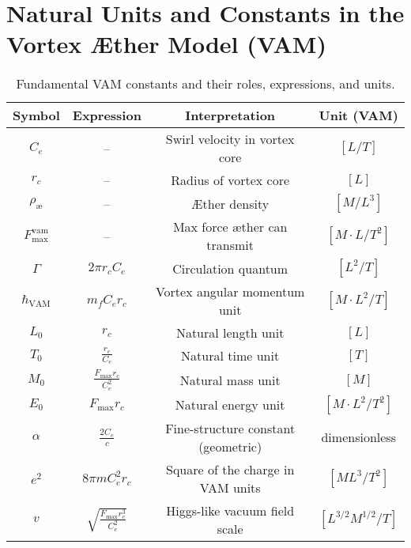 \section{Natural Units and Constants in the Vortex Æther Model (VAM)}
\renewcommand{\arraystretch}{1.3}
\begin{table}[H]
    \centering
    \footnotesize
    \caption{Fundamental VAM constants and their roles, expressions, and units.}
    \begin{tabular}{|c|c|c|c|}
        \hline
        \textbf{Symbol} & \textbf{Expression} & \textbf{Interpretation} & \textbf{Unit (VAM)} \\
        \hline
        $C_e$ & -- & Swirl velocity in vortex core & $[L/T]$ \\
        \hline
        $r_c$ & -- & Radius of vortex core & $[L]$ \\
        \hline
        $\rho_\text{\ae}$ & -- & Æther density & $[M/L^3]$ \\
        \hline
        $F^{\text{vam}}_\text{max}$ & -- & Max force æther can transmit & $[M \cdot L / T^2]$ \\
        \hline
        $\Gamma$ & $2\pi r_c C_e$ & Circulation quantum & $[L^2 / T]$ \\
        \hline
        $\hbar_\text{VAM}$ & $m_f C_e r_c$ & Vortex angular momentum unit & $[M \cdot L^2 / T]$ \\
        \hline
        $L_0$ & $r_c$ & Natural length unit & $[L]$ \\
        \hline
        $T_0$ & $\frac{r_c}{C_e}$ & Natural time unit & $[T]$ \\
        \hline
        $M_0$ & $\frac{F_\text{max} r_c}{C_e^2}$ & Natural mass unit & $[M]$ \\
        \hline
        $E_0$ & $F_\text{max} r_c$ & Natural energy unit & $[M \cdot L^2 / T^2]$ \\
        \hline
        $\alpha$ & $\frac{2 C_e}{c}$ & Fine-structure constant (geometric) & dimensionless \\
        \hline
        $e^2$ & $8\pi m C_e^2 r_c$ & Square of the charge in VAM units & $[M L^3 / T^2]$ \\
        \hline
        $v$ & $\sqrt{\frac{F_\text{max} r_c^3}{C_e^2}}$ & Higgs-like vacuum field scale & $[L^{3/2} M^{1/2} / T]$ \\
        \hline
    \end{tabular}
    \label{tab:VAM_constants_summary}
\end{table}
